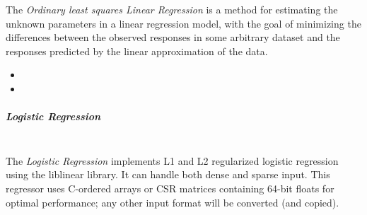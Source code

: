 The \textit{Ordinary least squares Linear Regression} is a method for
estimating the unknown parameters in a linear regression model, with the goal of
minimizing the differences between the observed responses in some arbitrary
dataset and the responses predicted by the linear approximation of the data.
%

\begin{itemize}
  \item {}
  \item {}
\end{itemize}
\subparagraph{Logistic Regression}
\mbox{}
\\The \textit{Logistic Regression} implements L1 and L2 regularized logistic
regression using the liblinear library.
%
It can handle both dense and sparse input.
%
This regressor uses C-ordered arrays or CSR matrices containing 64-bit floats
for optimal performance; any other input format will be converted (and copied).
%
